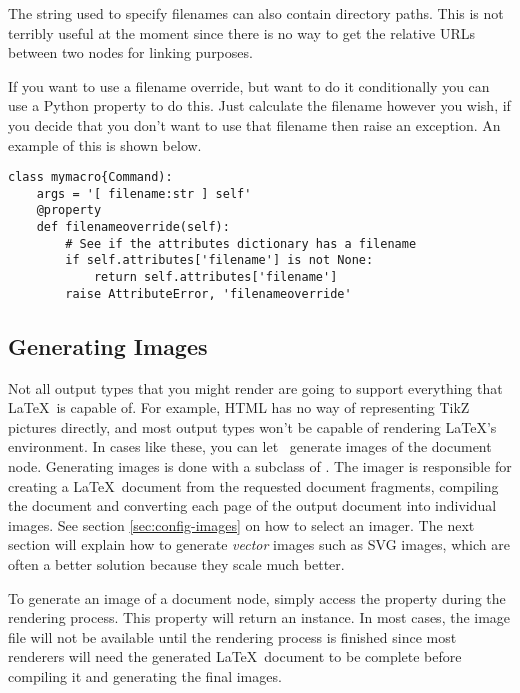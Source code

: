 The string used to specify filenames can also contain directory paths.
This is not terribly useful at the moment since there is no way to
get the relative URLs between two nodes for linking purposes.

If you want to use a filename override, but want to do it conditionally
you can use a Python property to do this.  Just calculate the filename
however you wish, if you decide that you don't want to use that filename
then raise an  exception.  An example of this
is shown below.
\begin{verbatim}
class mymacro{Command):
    args = '[ filename:str ] self'
    @property
    def filenameoverride(self):
        # See if the attributes dictionary has a filename
        if self.attributes['filename'] is not None:
            return self.attributes['filename']
        raise AttributeError, 'filenameoverride'
\end{verbatim}


\subsection{Generating Images}

Not all output types that you might render are going to support everything
that \LaTeX\ is capable of.  For example, HTML has no way of representing
TikZ pictures directly, and most output types won't be capable of rendering
\LaTeX's  environment.  In cases like these, you
can let \plasTeX\ generate images of the document node.  Generating
images is done with a subclass of .
The imager is responsible for creating a \LaTeX\ document from the
requested document fragments, compiling the document and converting
each page of the output document into individual images.
See section \ref{sec:config-images} on how to select an imager.
The next section will explain how to generate \emph{vector} images such
as SVG images, which are often a better solution because they scale much better.

To generate an image of a document node, simply access the 
property during the rendering process.  This property will return
an  instance.  In most cases, the image
file will not be available until the rendering process is finished
since most renderers will need the generated \LaTeX\ document to be
complete before compiling it and generating the final images.

